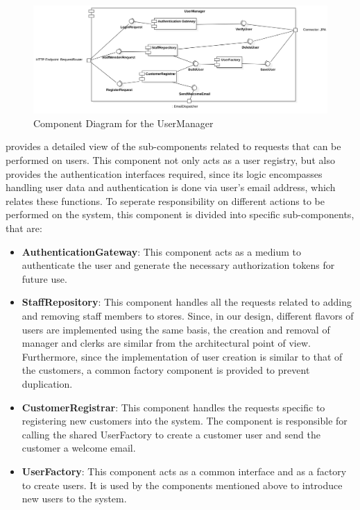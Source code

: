 \begin{figure}[H]
    \centering
    \includegraphics[height=0.4\textwidth]{Images/ComponentDiagrams/UserManager.png}
    \caption{Component Diagram for the UserManager}
    \label{fig:CDUserManager}
\end{figure}
 provides a detailed view of the sub-components related to requests that can be performed on users.
This component not only acts as a user registry, but also provides the authentication interfaces required, since its logic encompasses handling user data and authentication is done via user's email address, which relates these functions.
To seperate responsibility on different actions to be performed on the system, this component is divided into specific sub-components, that are:
\begin{itemize}
    \item \textbf{AuthenticationGateway}: This component acts as a medium to authenticate the user and generate the necessary authorization tokens for future use.
    \item \textbf{StaffRepository}: This component handles all the requests related to adding and removing staff members to stores.
    Since, in our design, different flavors of users are implemented using the same basis, the creation and removal of manager and clerks are similar from the architectural point of view.
    Furthermore, since the implementation of user creation is similar to that of the customers, a common factory component is provided to prevent duplication.
    \item \textbf{CustomerRegistrar}: This component handles the requests specific to registering new customers into the system.
    The component is responsible for calling the shared UserFactory to create a customer user and send the customer a welcome email.
    \item \textbf{UserFactory}: This component acts as a common interface and as a factory to create users.
    It is used by the components mentioned above to introduce new users to the system.
\end{itemize}

